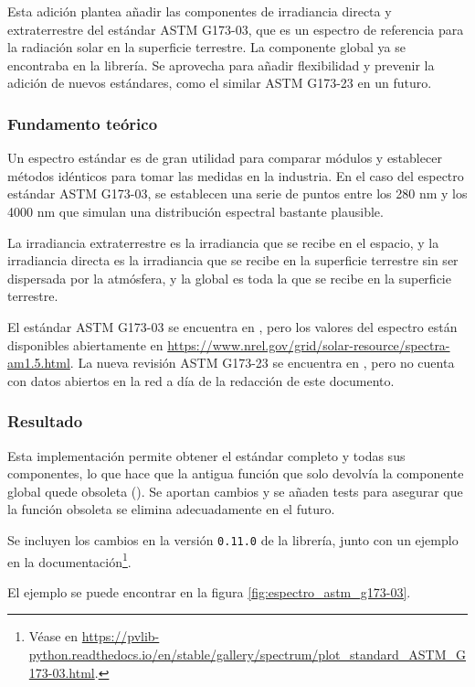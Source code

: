 Esta adición plantea añadir las componentes de irradiancia directa y extraterrestre del estándar ASTM G173-03, que es un espectro de referencia para la radiación solar en la superficie terrestre. La componente global ya se encontraba en la librería. Se aprovecha para añadir flexibilidad y prevenir la adición de nuevos estándares, como el similar ASTM G173-23 en un futuro.

\subsubsection{Fundamento teórico}

Un espectro estándar es de gran utilidad para comparar módulos y establecer métodos idénticos para tomar las medidas en la industria. En el caso del espectro estándar ASTM G173-03, se establecen una serie de puntos entre los 280 nm y los 4000 nm que simulan una distribución espectral bastante plausible.

La irradiancia extraterrestre es la irradiancia que se recibe en el espacio, y la irradiancia directa es la irradiancia que se recibe en la superficie terrestre sin ser dispersada por la atmósfera, y la global es toda la que se recibe en la superficie terrestre.

El estándar ASTM G173-03 se encuentra en \cite{astm_g173-03}, pero los valores del espectro están disponibles abiertamente en \url{https://www.nrel.gov/grid/solar-resource/spectra-am1.5.html}.
La nueva revisión ASTM G173-23 se encuentra en \cite{astm_g173-23}, pero no cuenta con datos abiertos en la red a día de la redacción de este documento.

\subsubsection{Resultado}

Esta implementación permite obtener el estándar completo y todas sus componentes, lo que hace que la antigua función que solo devolvía la componente global quede obsoleta (). Se aportan cambios y se añaden tests para asegurar que la función obsoleta se elimina adecuadamente en el futuro.

Se incluyen los cambios en la versión \texttt{0.11.0} de la librería, junto con un ejemplo en la documentación\footnote{Véase en \url{https://pvlib-python.readthedocs.io/en/stable/gallery/spectrum/plot_standard_ASTM_G173-03.html}.}.

El ejemplo se puede encontrar en la figura \ref{fig:espectro_astm_g173-03}.

